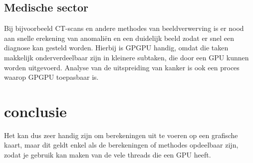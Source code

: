 \documentclass[11pt, a4paper]{article}
\begin{document}
\subsection{Medische sector}

Bij bijvoorbeeld CT-scans en andere methodes van beeldverwerving is er nood aan snelle erekening van anomali\"en en een duidelijk beeld zodat er snel een diagnose kan gesteld worden. Hierbij is GPGPU handig, omdat die taken makkelijk onderverdeelbaar zijn in kleinere subtaken, die door een GPU kunnen worden uitgevoerd. Analyse van de uitspreiding van kanker is ook een proces waarop GPGPU toepasbaar is.

\section{conclusie}

Het kan dus zeer handig zijn om berekeningen uit te voeren op een grafische kaart, maar dit geldt enkel als de berekeningen of methodes opdeelbaar zijn, zodat je gebruik kan maken van de vele threads die een GPU heeft.

\newpage
\end{document}
